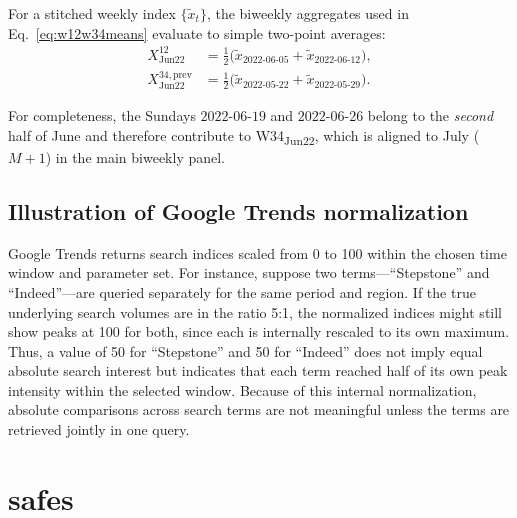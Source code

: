 \documentclass[12pt,a4paper]{article}
\begin{document}
For a stitched weekly index $\{\tilde{x}_{t}\}$, the biweekly aggregates used in Eq.~\eqref{eq:w12w34means} evaluate to simple two-point averages:
\begin{align*}
X^{12}_{\text{Jun22}}
&=
\frac{1}{2}\Big(\tilde{x}_{\text{2022-06-05}}+\tilde{x}_{\text{2022-06-12}}\Big),\\
X^{34,\text{prev}}_{\text{Jun22}}
&=
\frac{1}{2}\Big(\tilde{x}_{\text{2022-05-22}}+\tilde{x}_{\text{2022-05-29}}\Big).
\end{align*}

\noindent
For completeness, the Sundays $\text{2022-06-19}$ and $\text{2022-06-26}$ belong to the \emph{second} half of June and therefore contribute to W34\textsubscript{Jun22}, which is aligned to July ($M{+}1$) in the main biweekly panel.

\subsection{Illustration of Google Trends normalization}
\label{app:trends-normalization-example}

Google Trends returns search indices scaled from 0 to 100 within the chosen time window and parameter set. 
For instance, suppose two terms---“Stepstone” and “Indeed”---are queried separately for the same period and region.
If the true underlying search volumes are in the ratio 5:1, the normalized indices might still show peaks at 100 for both, since each is internally rescaled to its own maximum. 
Thus, a value of 50 for “Stepstone” and 50 for “Indeed” does not imply equal absolute search interest but indicates that each term reached half of its own peak intensity within the selected window. 
Because of this internal normalization, absolute comparisons across search terms are not meaningful unless the terms are retrieved jointly in one query.















\section{safes}
\end{document}
